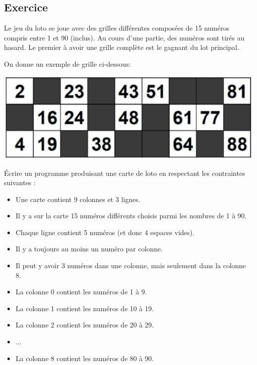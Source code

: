 \documentclass[11pt,a4paper]{article}
\newcounter{numexo}
\begin{document}
\newpage
\addtocounter{numexo}{1}
\subsection*{\Large Exercice \thenumexo }
Le jeu du loto se joue avec des grilles différentes composées de 15 numéros compris entre 1 et 90 (inclus). Au cours d'une partie, des numéros sont tirés au hasard. Le premier à avoir une grille complète est le gagnant du lot principal.

On donne un exemple de grille ci-dessous:

\begin{center}
\includegraphics[scale=0.6]{img/loto.eps}
\end{center}

Écrire un programme produisant une carte de loto en respectant les contraintes suivantes :
\begin{itemize}
\item Une carte contient 9 colonnes et 3 lignes.
\item Il y a sur la carte 15 numéros différents choisis parmi les nombres de 1 à 90.
\item Chaque ligne contient 5 numéros (et donc 4 espaces vides).
\item Il y a toujours au moins un numéro par colonne.
\item Il peut y avoir 3 numéros dans une colonne, mais seulement dans la colonne 8.
\item La colonne 0 contient les numéros de 1 à 9.
\item La colonne 1 contient les numéros de 10 à 19.
\item La colonne 2 contient les numéros de 20 à 29.
\item ...
\item La colonne 8 contient les numéros de 80 à 90.
\end{itemize}
\end{document}
